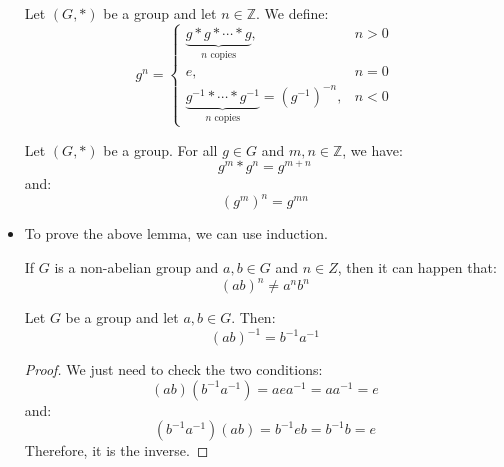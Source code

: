 \begin{itemize}
    \begin{definition}
        Let $(G,*)$ be a group and let $n\in \mathbb{Z}$. We define:
        \begin{equation}
            g^n = \begin{cases}
                \underbrace{g*g*\cdots*g}_{n \text{ copies}},& n >0 \\ 
                e,& n = 0 \\ 
                \underbrace{g^{-1}*\cdots*g^{-1}}_{n \text{ copies}} = (g^{-1})^{-n},& n<0
            \end{cases}
        \end{equation}
    \end{definition}
    \begin{lemma}
        Let $(G,*)$ be a group. For all $g\in G$ and $m,n \in \mathbb{Z}$, we have:
        \begin{equation}
            g^m*g^n = g^{m+n}
        \end{equation}
        and:
        \begin{equation}
            (g^m)^n = g^{mn}
        \end{equation}
    \end{lemma}
    \item To prove the above lemma, we can use induction.
    \begin{warning}
        If $G$ is a non-abelian group and $a,b\in G$ and $n\in Z$, then it can happen that:
        \begin{equation}
            (ab)^n \neq a^nb^n
        \end{equation}
    \end{warning}
    \begin{lemma}
        Let $G$ be a group and let $a,b\in G$. Then:
        \begin{equation}
            (ab)^{-1} = b^{-1}a^{-1}
        \end{equation}
        \begin{proof}
            We just need to check the two conditions:
            \begin{equation}
                (ab)(b^{-1}a^{-1})=aea^{-1}=aa^{-1}=e
            \end{equation}
            and:
            \begin{equation}
                (b^{-1}a^{-1})(ab) = b^{-1}eb = b^{-1}b = e
            \end{equation}
            Therefore, it is the inverse.
        \end{proof}

\end{lemma}
\end{itemize}
